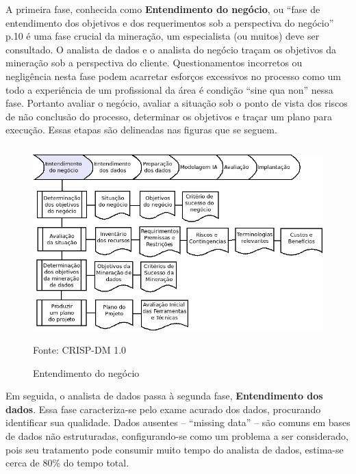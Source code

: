 A primeira fase, conhecida como \textbf{Entendimento do negócio}, ou ``fase de entendimento dos objetivos e dos requerimentos sob a 
perspectiva do negócio'' \cite{Chapman2000} p.{10} é uma fase crucial da mineração,  um especialista (ou muitos) deve ser consultado. 
O analista de dados e o analista do negócio traçam os objetivos da mineração sob a perspectiva do cliente. Questionamentos incorretos 
ou negligência nesta fase podem acarretar esforços excessivos no processo como um todo a experiência de um profissional da área 
é condição ``sine qua non'' nessa fase. Portanto avaliar o negócio, avaliar a situação sob o ponto de vista dos riscos de não conclusão 
do processo, determinar os objetivos e traçar um plano para execução. Essas etapas são delineadas nas figuras que se seguem.

\begin{figure}[!ht]
\centering
\caption{Entendimento do negócio}
\vspace{1mm}
\includegraphics[width=120mm, height=75mm]{Figuras/Cronograma/Entendimento.png}\\
\tiny Fonte: CRISP-DM 1.0
\end{figure}

\pagebreak

\vspace{0.5cm}

Em seguida, o analista de dados passa à segunda fase, \textbf{Entendimento dos dados}. Essa fase caracteriza-se pelo exame acurado dos dados, procurando identificar sua qualidade. 
Dados ausentes -- ``missing data'' -- são comuns em bases de dados não estruturadas, configurando-se como
um problema a ser considerado, pois seu tratamento pode consumir muito tempo do analista de dados, estima-se cerca de 80\% do tempo total. 

